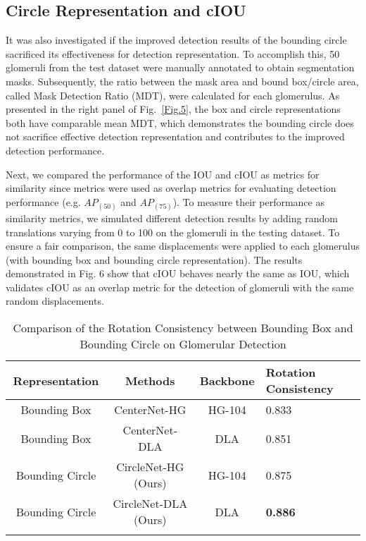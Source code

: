 \documentclass[journal]{IEEEtran}
\newcommand{\Fig}{Fig.}
\begin{document}
\subsection{Circle Representation and cIOU}
It was also investigated if the improved detection results of the bounding circle sacrificed its effectiveness for detection representation. To accomplish this, 50 glomeruli from the test dataset were manually annotated to obtain segmentation masks. Subsequently, the ratio between the mask area and bound box/circle area, called Mask Detection Ratio (MDT), were calculated for each glomerulus. As presented in the right panel of \Fig~\ref{Fig.5}, the box and circle representations both have comparable mean MDT, which demonstrates the bounding circle does not sacrifice effective detection representation and contributes to the improved detection performance.

Next, we compared the performance of the IOU and cIOU as metrics for similarity since metrics were used as overlap metrics for evaluating detection performance (e.g. $AP_{(50)}$ and $AP_{(75)}$). To measure their performance as similarity metrics, we simulated different detection results by adding random translations varying from 0 to 100 on the glomeruli in the testing dataset. To ensure a fair comparison, the same displacements were applied to each glomerulus (with bounding box and bounding circle representation). The results demonstrated in Fig. 6 show that cIOU behaves nearly the same as IOU, which validates cIOU as an overlap metric for the detection of glomeruli with the same random displacements. 

\begin{table}
\caption{Comparison of the Rotation Consistency between Bounding Box and Bounding Circle on Glomerular Detection}
\centering
\begin{tabular}{cccm{}<{\centering}}
\hline
Representation & Methods & Backbone & Rotation Consistency \\
\hline
Bounding Box & CenterNet-HG\cite{zhou2019objects} &  HG-104 & 0.833 \\
Bounding Box & CenterNet-DLA\cite{zhou2019objects} & DLA & 0.851 \\
\hline
Bounding Circle $\quad$ & CircleNet-HG (Ours) & HG-104  & 0.875 \\ 
Bounding Circle $\quad$ & CircleNet-DLA (Ours) & DLA & \textbf{0.886}  \\ 
\hline
\label{table2}
\end{tabular}
\end{table}
\end{document}
